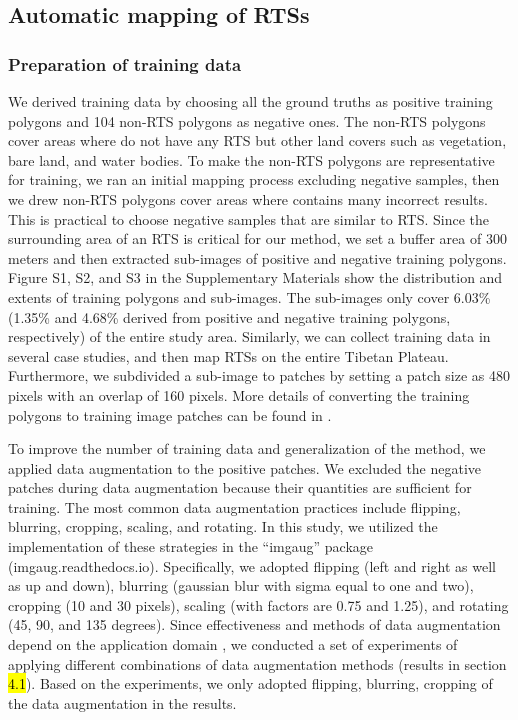 \documentclass[preprint,12pt,authoryear]{elsarticle}
\begin{document}
\subsection{Automatic mapping of RTSs}
\label{subsec_auto_mapping}

\subsubsection{Preparation of training data}
\label{subsubsec_pre_trainingdata}

We derived training data by choosing all the ground truths as positive training polygons and 104 non-RTS polygons as negative ones. The non-RTS polygons cover areas where do not have any RTS but other land covers such as vegetation, bare land, and water bodies. To make the non-RTS polygons are representative for training, we ran an initial mapping process excluding negative samples, then we drew non-RTS polygons cover areas where contains many incorrect results. This is practical to choose negative samples that are similar to RTS. Since the surrounding area of an RTS is critical for our method, we set a buffer area of 300 meters and then extracted sub-images of positive and negative training polygons. Figure S1, S2, and S3 in the Supplementary Materials show the distribution and extents of training polygons and sub-images. The sub-images only cover 6.03\% (1.35\% and 4.68\% derived from positive and negative training polygons, respectively) of the entire study area. Similarly, we can collect training data in several case studies, and then map RTSs on the entire Tibetan Plateau. Furthermore, we subdivided a sub-image to patches by setting a patch size as 480 pixels with an overlap of 160 pixels. More details of converting the training polygons to training image patches can be found in \cite{huang2018automatic}. 

To improve the number of training data and generalization of the method, we applied data augmentation to the positive patches. We excluded the negative patches during data augmentation because their quantities are sufficient for training. The most common data augmentation practices include flipping, blurring, cropping, scaling, and rotating. In this study, we utilized the implementation of these strategies in the “imgaug” package (imgaug.readthedocs.io). Specifically, we adopted flipping (left and right as well as up and down), blurring (gaussian blur with sigma equal to one and two), cropping (10 and 30 pixels), scaling (with factors are 0.75 and 1.25), and rotating (45, 90, and 135 degrees). Since effectiveness and methods of data augmentation depend on the application domain \citep{perez2017effectiveness}, we conducted a set of experiments of applying different combinations of data augmentation methods (results in section \hl{ 4.1}). Based on the experiments, we only adopted flipping, blurring, cropping of the data augmentation in the results. 
\end{document}
